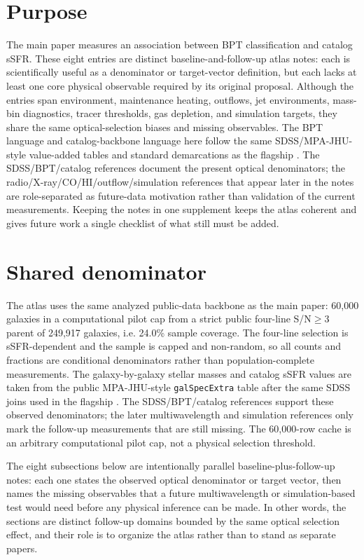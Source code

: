 \documentclass[twocolumn]{aastex631}
\begin{document}
\section{Purpose}
The main paper measures an association between BPT classification and catalog sSFR. These eight entries are distinct baseline-and-follow-up atlas notes: each is scientifically useful as a denominator or target-vector definition, but each lacks at least one core physical observable required by its original proposal. Although the entries span environment, maintenance heating, outflows, jet environments, mass-bin diagnostics, tracer thresholds, gas depletion, and simulation targets, they share the same optical-selection biases and missing observables. The BPT language and catalog-backbone language here follow the same SDSS/MPA-JHU-style value-added tables and standard demarcations as the flagship \citep{sdssdr17,brinchmann2004,york2000,baldwin1981,kewley2001,kauffmann2003bpt,kewley2006,stasinska2008,stasinska2015}. The SDSS/BPT/catalog references document the present optical denominators; the radio/X-ray/CO/HI/outflow/simulation references that appear later in the notes are role-separated as future-data motivation rather than validation of the current measurements. Keeping the notes in one supplement keeps the atlas coherent and gives future work a single checklist of what still must be added.

\section{Shared denominator}
The atlas uses the same analyzed public-data backbone as the main paper: 60,000 galaxies in a computational pilot cap from a strict public four-line S/N$\geq3$ parent of 249,917 galaxies, i.e. 24.0\% sample coverage. The four-line selection is sSFR-dependent and the sample is capped and non-random, so all counts and fractions are conditional denominators rather than population-complete measurements. The galaxy-by-galaxy stellar masses and catalog sSFR values are taken from the public MPA-JHU-style \texttt{galSpecExtra} table after the same SDSS joins used in the flagship \citep{sdssdr17,brinchmann2004,york2000}. The SDSS/BPT/catalog references support these observed denominators; the later multiwavelength and simulation references only mark the follow-up measurements that are still missing. The 60,000-row cache is an arbitrary computational pilot cap, not a physical selection threshold.

The eight subsections below are intentionally parallel baseline-plus-follow-up notes: each one states the observed optical denominator or target vector, then names the missing observables that a future multiwavelength or simulation-based test would need before any physical inference can be made. In other words, the sections are distinct follow-up domains bounded by the same optical selection effect, and their role is to organize the atlas rather than to stand as separate papers.
\end{document}
